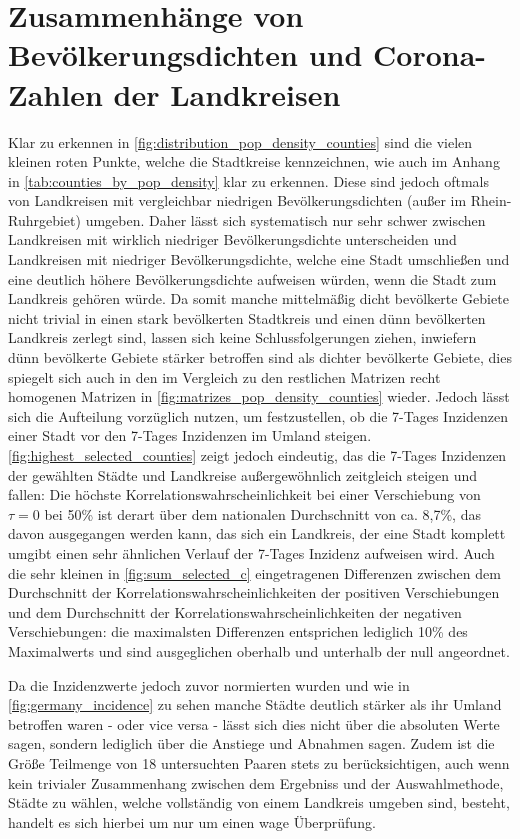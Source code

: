 \section{Zusammenhänge von Bevölkerungsdichten und Corona-Zahlen der Landkreisen}\label{sec:discussion:pop_density}
Klar zu erkennen in \autoref{fig:distribution_pop_density_counties} sind die vielen kleinen roten Punkte, welche die Stadtkreise kennzeichnen, wie auch im Anhang in \autoref{tab:counties_by_pop_density} klar zu erkennen.
Diese sind jedoch oftmals von Landkreisen mit vergleichbar niedrigen Bevölkerungsdichten (außer im Rhein-Ruhrgebiet) umgeben. Daher lässt sich systematisch nur sehr schwer zwischen Landkreisen mit wirklich niedriger Bevölkerungsdichte unterscheiden und Landkreisen mit niedriger Bevölkerungsdichte, welche eine Stadt umschließen und eine deutlich höhere Bevölkerungsdichte aufweisen würden, wenn die Stadt zum Landkreis gehören würde. Da somit manche mittelmäßig dicht bevölkerte Gebiete nicht trivial in einen stark bevölkerten Stadtkreis und einen dünn bevölkerten Landkreis zerlegt sind, lassen sich keine Schlussfolgerungen ziehen, inwiefern dünn bevölkerte Gebiete stärker betroffen sind als dichter bevölkerte Gebiete, dies spiegelt sich auch in den im Vergleich zu den restlichen Matrizen recht homogenen Matrizen in \autoref{fig:matrizes_pop_density_counties} wieder.
Jedoch lässt sich die Aufteilung vorzüglich nutzen, um festzustellen, ob die 7-Tages Inzidenzen einer Stadt vor den 7-Tages Inzidenzen im Umland steigen.
\autoref{fig:highest_selected_counties} zeigt jedoch eindeutig, das die 7-Tages Inzidenzen der gewählten Städte und Landkreise außergewöhnlich zeitgleich steigen und fallen: Die höchste Korrelationswahrscheinlichkeit bei einer Verschiebung von $\tau=0$ bei 50\% ist derart über dem nationalen Durchschnitt von ca. 8,7\%, das davon ausgegangen werden kann, das sich ein Landkreis, der eine Stadt komplett umgibt einen sehr ähnlichen Verlauf der 7-Tages Inzidenz aufweisen wird.
Auch die sehr kleinen in \autoref{fig:sum_selected_c} eingetragenen Differenzen zwischen dem Durchschnitt der Korrelationswahrscheinlichkeiten der positiven Verschiebungen und dem Durchschnitt der Korrelationswahrscheinlichkeiten der negativen Verschiebungen: die maximalsten Differenzen entsprichen lediglich 10\% des Maximalwerts und sind ausgeglichen oberhalb und unterhalb der null angeordnet.

Da die Inzidenzwerte jedoch zuvor normierten wurden und wie in \autoref{fig:germany_incidence} zu sehen manche Städte deutlich stärker als ihr Umland betroffen waren - oder vice versa - lässt sich dies nicht über die absoluten Werte sagen, sondern lediglich über die Anstiege und Abnahmen sagen.
Zudem ist die Größe Teilmenge von 18 untersuchten Paaren stets zu berücksichtigen, auch wenn kein trivialer Zusammenhang zwischen dem Ergebniss und der Auswahlmethode, Städte zu wählen, welche vollständig von einem Landkreis umgeben sind, besteht, handelt es sich hierbei um nur um einen wage Überprüfung.

